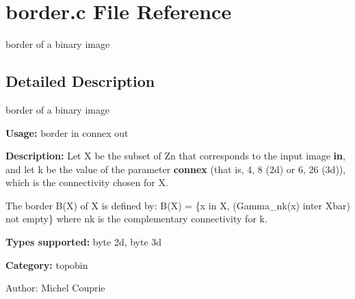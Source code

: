 \section{border.c File Reference}
\label{border_8c}
border of a binary image 



\subsection{Detailed Description}
border of a binary image 

{\bf Usage:} border in connex out

{\bf Description:} Let X be the subset of Zn that corresponds to the input image {\bf in}, and let k be the value of the parameter {\bf connex} (that is, 4, 8 (2d) or 6, 26 (3d)), which is the connectivity chosen for X.

The border B(X) of X is defined by: B(X) = \{x in X, (Gamma\_\-nk(x) inter Xbar) not empty\} where nk is the complementary connectivity for k.

{\bf Types supported:} byte 2d, byte 3d

{\bf Category:} topobin

\begin{Desc}
\item[Author:]Michel Couprie \end{Desc}

